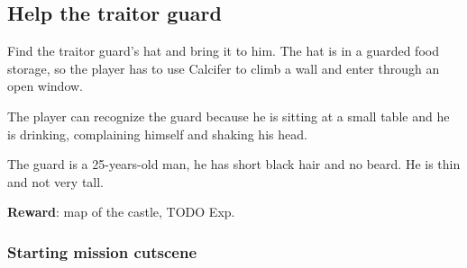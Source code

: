 \subsection{Help the traitor guard}
Find the traitor guard's hat and bring it to him. The hat is in a guarded food storage, so the player has to use Calcifer to climb a wall and enter through an open window.

The player can recognize the guard because he is sitting at a small table and he is drinking, complaining himself and shaking his head.

The guard is a 25-years-old man, he has short black hair and no beard. He is thin and not very tall.

\textbf{Reward}: map of the castle, TODO Exp.

\subsubsection*{Starting mission cutscene}

